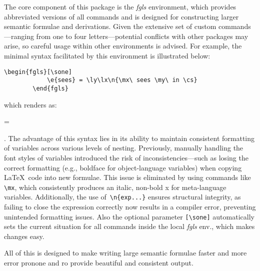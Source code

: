 \documentclass[10pt, a4paper]{article}
\begin{document}
	The core component of this package is the \textit{fgls} environment, which provides abbreviated versions of all commands and is designed for constructing larger semantic formulae and derivations. Given the extensive set of custom commands—ranging from one to four letters—potential conflicts with other packages may arise, so careful usage within other environments is advised.
	For example, the minimal syntax facilitated by this environment is illustrated below:
	\begin{lstlisting}[style=B]
		\begin{fgls}[\sone]
			\e{sees} = \ly\lx\n{\mx\ sees \my\ in \cs}
		\end{fgls}
	\end{lstlisting} which renders as: 
	\begin{fgls}[\sone]
		 = \ly\lx{}
	\end{fgls}.
	The advantage of this syntax lies in its ability to maintain consistent formatting of variables across various levels of nesting. Previously, manually handling the font styles of variables introduced the risk of in\-con\-sis\-ten\-cies—such as losing the correct formatting (e.g., boldface for object-language variables) when copying \LaTeX\ code into new formulae. This issue is eliminated by using commands like \verb=\mx=, which consistently produces an italic, non-bold x for meta-language variables. Additionally, the use of\ \verb=\n{exp...}= ensures structural integrity, as failing to close the expression correctly now results in a compiler error, preventing unintended formatting issues. Also the optional parameter \verb=[\sone]= automatically sets the current situation for all commands inside the local \textit{fgls} env., which makes changes easy.
	
	All of this is designed to make writing large semantic formulae faster and more error pronone and ro provide beautiful and consistent output.
\end{document}
